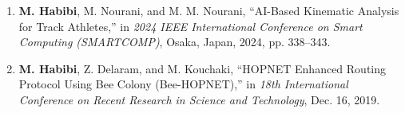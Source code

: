 \documentclass[10pt,a4paper,sans]{moderncv}
\begin{document}
\begin{enumerate}
    \item \textbf{M. Habibi}, M. Nourani, and M. M. Nourani, ``AI-Based Kinematic Analysis for Track Athletes,'' in \textit{2024 IEEE International Conference on Smart Computing (SMARTCOMP)}, Osaka, Japan, 2024, pp. 338--343.

    \item \textbf{M. Habibi}, Z. Delaram, and M. Kouchaki, ``HOPNET Enhanced Routing Protocol Using Bee Colony (Bee-HOPNET),'' in \textit{18th International Conference on Recent Research in Science and Technology}, Dec. 16, 2019.

\end{enumerate}
\end{document}
